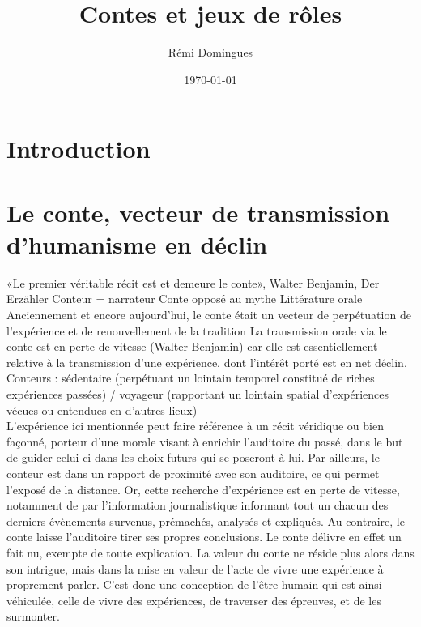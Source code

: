 \documentclass[a4paper,12pt,final,oneside]{article}
\title{Contes et jeux de rôles}
\author{Rémi Domingues}
\date{\today}
\begin{document}
\maketitle
\clearpage


\thispagestyle{empty}
\tableofcontents
\clearpage


\section{Introduction}
\setcounter{page}{1}
\clearpage


\section{Le conte, vecteur de transmission d'humanisme en déclin}
\cite{nouss2003conteur}
«Le premier véritable récit est et demeure le conte», Walter Benjamin, Der Erzähler\cite{benjamin1991gesammelte}
Conteur = narrateur
Conte opposé au mythe
Littérature orale
Anciennement et encore aujourd'hui, le conte était un vecteur de perpétuation de l'expérience et de renouvellement de la tradition
La transmission orale via le conte est en perte de vitesse (Walter Benjamin) car elle est essentiellement relative à la transmission d'une expérience, dont l'intérêt porté est en net déclin.
Conteurs : sédentaire (perpétuant un lointain temporel constitué de riches expériences passées) / voyageur (rapportant un lointain spatial d'expériences vécues ou entendues en d'autres lieux)\\

L'expérience ici mentionnée peut faire référence à un récit véridique ou bien façonné, porteur d'une morale visant à enrichir l'auditoire du passé, dans le but de guider celui-ci dans les choix futurs qui se poseront à lui.
Par ailleurs, le conteur est dans un rapport de proximité avec son auditoire, ce qui permet l'exposé de la distance.
Or, cette recherche d'expérience est en perte de vitesse, notamment de par l'information journalistique informant tout un chacun des derniers évènements survenus, prémachés, analysés et expliqués. Au contraire, le conte laisse l'auditoire tirer ses propres conclusions. Le conte délivre en effet un fait nu, exempte de toute explication. La valeur du conte ne réside plus alors dans son intrigue, mais dans la mise en valeur de l'acte de vivre une expérience à proprement parler. C'est donc une conception de l'être humain qui est ainsi véhiculée, celle de vivre des expériences, de traverser des épreuves, et de les surmonter.\\
\end{document}
